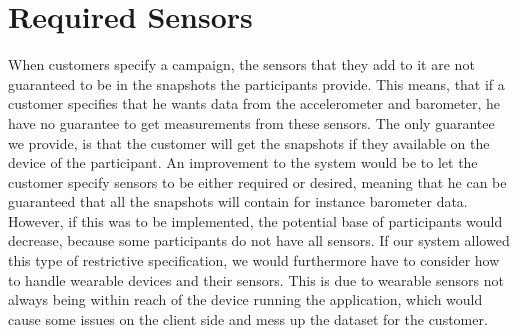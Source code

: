 
\section{Required Sensors}

When customers specify a campaign, the sensors that they add to it are not guaranteed to be in the snapshots the participants provide. This means, that if a customer specifies that he wants data from the accelerometer and barometer, he have no guarantee to get measurements from these sensors. The only guarantee we provide, is that the customer will get the snapshots if they available on the device of the participant. An improvement to the system would be to let the customer specify sensors to be either required or desired, meaning that he can be guaranteed that all the snapshots will contain for instance barometer data. However, if this was to be implemented, the potential base of participants would decrease, because some participants do not have all sensors. If our system allowed this type of restrictive specification, we would furthermore have to consider how to handle wearable devices and their sensors. This is due to wearable sensors not always being within reach of the device running the application, which would cause some issues on the client side and mess up the dataset for the customer.   
